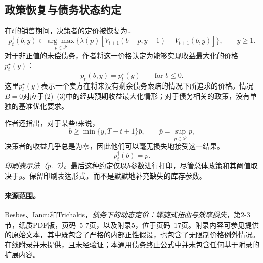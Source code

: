 \documentclass{article}
\begin{document}
\subsection*{政策恢复与债务状态约定}

在\(t\)的销售期间，决策者的定价被恢复为…
\[
p_t^{\dagger}(b,y)\in
\underset{p\in\mathcal P}{\arg\max}
\bigl\{\lambda(p)
[V_{t+1}(b-p,y-1)-V_{t+1}(b,y)]\bigr\},
\qquad y\ge1.
\]
对于非正值的未偿债务，作者将这一价格认定为能够实现收益最大化的价格\(p_t^{\star}(y)\)：
\[
p_t^{\dagger}(b,y)=p_t^{\star}(y)
\qquad\text{for }b\le0.
\]
这里\(p_t^{\star}(y)\)表示一个卖方在将来没有剩余债务索赔的情况下所追求的价格。情况\(B=0\)对应于(2)--(3)中的经典预期收益最大化情形；对于债务相关的政策，没有单独的基准优化要求。

作者还指出，对于某些\(t\)来说，
\[
b\ge\min\{y,T-t+1\}\bar p,
\qquad
\bar p=\sup_{p\in\mathcal P}p,
\]
决策者的收益几乎总是为零，因此他们可以毫无损失地接受这一结果。
\[
p_t^{\dagger}(b)=\bar p.
\]
\emph{印刷表示法（p.~7）。}最后这种约定仅以\(b\)参数进行打印，尽管总体政策和其阈值取决于\(y\)。保留印刷表达形式，而不是默默地补充缺失的库存参数。

\paragraph{来源范围。}
Besbes、Iancu和Trichakis，\emph{债务下的动态定价：螺旋式扭曲与效率损失}，第2-3节，纸质PDF版，页码~5-7页，以及附录5，位于页码~17页。附录内容可参见提供的原始文本，其中既包含了严格的内部正性假设，也包含了无限制价格例外情况。在线附录并未提供，且未经验证；本通用债务终止公式中并未包含任何基于附录的扩展内容。
\end{document}
